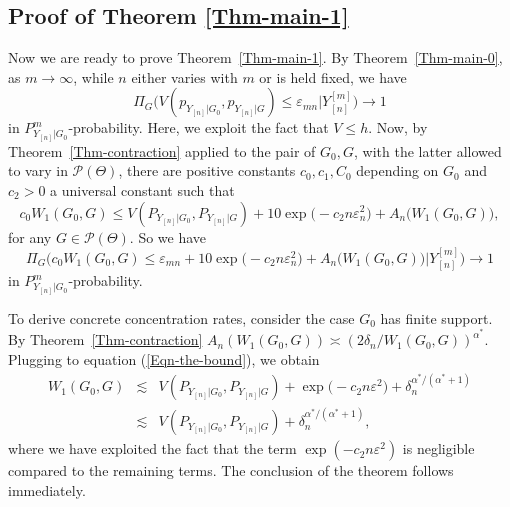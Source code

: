 \documentclass[MSNbibl,number,citesort]{arxbj}
\newcommand{\eqref}[1]{(\ref{#1})}
\newcommand{\Pcal}{\mathscr{P}}
\newcommand{\PGz}{P_{Y_{[n]}|G_0}}
\newcommand{\PG}{P_{Y_{[n]}|G}}
\newcommand{\YYn}{Y_{[n]}}
\newcommand{\epsmn}{\varepsilon_{mn}}
\begin{document}
\subsection{Proof of Theorem \texorpdfstring{\protect\ref{Thm-main-1}}{2.2}}

Now we are ready to prove Theorem~\ref{Thm-main-1}.
By Theorem~\ref{Thm-main-0}, as $m \rightarrow\infty$,
while $n$ either varies with $m$ or is held fixed, we have
%
\[
\Pi_G \bigl(V({p_{Y_{[n]}|G_0}},
{p_{Y_{[n]}|G}}) \leq\epsmn| \YYn^{[m]} \bigr)
\rightarrow1
\]
%
in $\PGz^m$-probability. Here, we exploit the fact that $V \leq h$.
Now, by Theorem~\ref{Thm-contraction} applied to the pair
of $G_0,G$, with the latter allowed to vary in $\Pcal(\Theta)$,
there are positive constants $c_0, c_1, C_0$ depending on $G_0$
and $c_2 > 0$ a universal constant such that
%
%
\begin{equation}
\label{Eqn-the-bound} c_0 W_1(G_0,G) \leq V(\PGz,
\PG) + 10 \exp \bigl(-c_2 n\varepsilon_n^2
\bigr) + A_n \bigl(W_1(G_0,G) \bigr),
\end{equation}
%
for any $G\in\Pcal(\Theta)$.
So we have
%
\[
\Pi_G \bigl(c_0 W_1(G_0,G)
\leq \epsmn+ 10 \exp \bigl(-c_2 n\varepsilon_n^2
\bigr) + A_n \bigl(W_1(G_0,G) \bigr) |
\YYn^{[m]} \bigr) \rightarrow1
\]
%
in $\PGz^m$-probability.

To derive concrete concentration rates,
consider the case $G_0$ has finite support. By Theorem~\ref{Thm-contraction}
$A_n(W_1(G_0,G)) \asymp(2\delta_n/W_1(G_0,G))^{{\alpha^*}}$.
Plugging to equation \eqref{Eqn-the-bound}, we obtain
%
\begin{eqnarray*}
W_1(G_0,G) &\lesssim& V(\PGz,\PG) +\exp
\bigl(-c_2n\varepsilon^2 \bigr) + \delta_n^{{\alpha^*}/({\alpha^*}+1)}
\\
&\lesssim & V(\PGz,\PG) + \delta_n^{{\alpha^*}/({\alpha^*}+1)},
\end{eqnarray*}
%
where we have exploited the fact that the term $\exp(-c_2n\varepsilon^2)$
is negligible compared to the remaining terms. The conclusion
of the theorem follows immediately.
\end{document}
